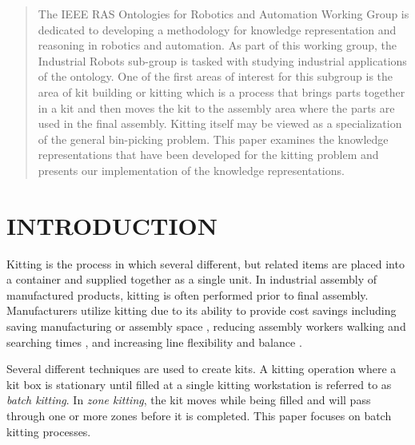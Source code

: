 






\maketitle
\thispagestyle{empty}
\pagestyle{empty}


\begin{abstract}

The IEEE RAS Ontologies for Robotics and Automation Working Group is dedicated to developing a methodology for knowledge representation and reasoning in robotics and automation. As part of this working group, the Industrial Robots sub-group is tasked with studying industrial applications of the ontology. One of the first areas of interest for this subgroup is the area of kit building or kitting which is a process that brings parts together in a kit and then moves the kit to the assembly area where the parts are used in the final assembly. Kitting itself may be viewed as a specialization of the general bin-picking problem. This paper examines the knowledge representations that have been developed for the kitting problem and presents our implementation of the knowledge representations.

\end{abstract}


\section{INTRODUCTION}
Kitting is the process in which several different, but related items are placed into a container and supplied together as a single unit.
In industrial assembly of manufactured products, kitting is often performed prior to final assembly. Manufacturers utilize kitting
due to its ability to provide cost savings \cite{Carlsson_2008} including saving manufacturing or assembly space \cite{Medbo2003}, reducing assembly workers walking and searching times \cite{Schwind1992}, and increasing line flexibility \cite{Bozer1992} and balance \cite{Jiao2000}.

Several different techniques are used to create kits. A kitting operation where a kit box is stationary until filled at a single
kitting workstation is referred to as {\it batch kitting}. In {\it zone kitting}, the kit moves while being filled and will pass through one or
more zones before it is completed. This paper focuses on batch kitting processes.

